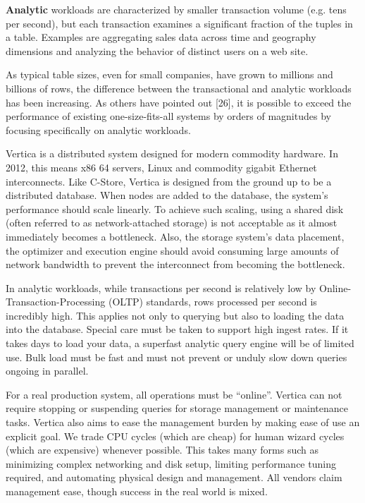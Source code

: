 \documentclass[a4paper,12pt,notitlepage,twoside,openright]{article}
\begin{document}
\textbf{Analytic} workloads are characterized by smaller transaction
volume (e.g. tens per second), but each transaction examines a
significant fraction of the tuples in a table. Examples are aggregating
sales data across time and geography dimensions and analyzing the
behavior of distinct users on a web site.

As typical table sizes, even for small companies, have grown to millions
and billions of rows, the difference between the transactional and
analytic workloads has been increasing. As others have pointed out
{[}26{]}, it is possible to exceed the performance of existing
one-size-fits-all systems by orders of magnitudes by focusing
specifically on analytic workloads.

Vertica is a distributed system designed for modern commodity hardware.
In 2012, this means x86 64 servers, Linux and commodity gigabit Ethernet
interconnects. Like C-Store, Vertica is designed from the ground up to
be a distributed database. When nodes are added to the database, the
system's performance should scale linearly. To achieve such scaling,
using a shared disk (often referred to as network-attached storage) is
not acceptable as it almost immediately becomes a bottleneck. Also, the
storage system's data placement, the optimizer and execution engine
should avoid consuming large amounts of network bandwidth to prevent the
interconnect from becoming the bottleneck.

In analytic workloads, while transactions per second is relatively low
by Online-Transaction-Processing (OLTP) standards, rows processed per
second is incredibly high. This applies not only to querying but also to
loading the data into the database. Special care must be taken to
support high ingest rates. If it takes days to load your data, a
superfast analytic query engine will be of limited use. Bulk load must
be fast and must not prevent or unduly slow down queries ongoing in
parallel.

For a real production system, all operations must be ``online''. Vertica
can not require stopping or suspending queries for storage management or
maintenance tasks. Vertica also aims to ease the management burden by
making ease of use an explicit goal. We trade CPU cycles (which are
cheap) for human wizard cycles (which are expensive) whenever possible.
This takes many forms such as minimizing complex networking and disk
setup, limiting performance tuning required, and automating physical
design and management. All vendors claim management ease, though success
in the real world is mixed.
\end{document}
